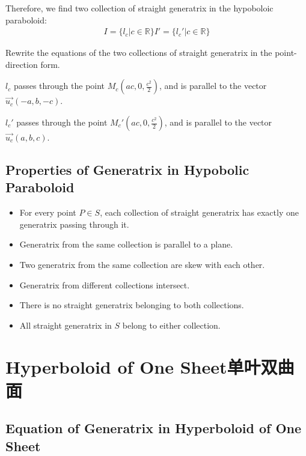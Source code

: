 \documentclass[onecolumn]{ctexart}
\begin{document}
Therefore, we find two collection of straight generatrix in the hypoboloic 
paraboloid:
\begin{equation}
  \begin{split}
    I = \lbrace l_c | c \in \mathbb{R} \rbrace
    I' = \lbrace l_c' | c \in \mathbb{R} \rbrace
  \end{split}
\end{equation}

Rewrite the equations of the two collections of straight generatrix in the
point-direction form.

$l_c$ passes through the point $M_c(ac, 0, \frac{c^2}{2})$, and is parallel to 
the vector $\vec{u_c}(-a, b, -c)$.

$l_c'$ passes through the point $M_c'(ac, 0, \frac{c^2}{2})$, and is parallel to 
the vector $\vec{u_c}(a, b, c)$.

\subsection{Properties of Generatrix in Hypobolic Paraboloid}
\begin{itemize}
  \item For every point $P \in S$, each collection of straight generatrix has 
  exactly one generatrix passing through it.
  \item Generatrix from the same collection is parallel to a plane.
  \item Two generatrix from the same collection are skew with each other.
  \item Generatrix from different collections intersect.
  \item There is no straight generatrix belonging to both collections.
  \item All straight generatrix in $S$ belong to either collection.
\end{itemize}

\section{Hyperboloid of One Sheet单叶双曲面}

\subsection{Equation of Generatrix in Hyperboloid of One Sheet}
\end{document}
